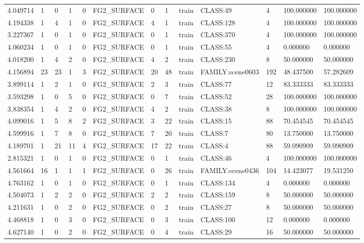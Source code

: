 \begin{tabular}{lllllllllllll}
4.049714 & 1 & 0 & 1 & 0 & FG2\_SURFACE & 0 & 1 & train & CLASS:49 & 4 & 100.000000 & 100.000000 \\
4.194338 & 1 & 4 & 1 & 0 & FG2\_SURFACE & 4 & 1 & train & CLASS:128 & 4 & 100.000000 & 100.000000 \\
3.227367 & 1 & 0 & 1 & 0 & FG2\_SURFACE & 0 & 1 & train & CLASS:370 & 4 & 100.000000 & 100.000000 \\
4.060234 & 1 & 0 & 1 & 0 & FG2\_SURFACE & 0 & 1 & train & CLASS:55 & 4 & 0.000000 & 0.000000 \\
4.018200 & 1 & 4 & 2 & 0 & FG2\_SURFACE & 4 & 2 & train & CLASS:230 & 8 & 50.000000 & 50.000000 \\
4.156894 & 23 & 23 & 1 & 3 & FG2\_SURFACE & 20 & 48 & train & FAMILY:scene0603 & 192 & 48.437500 & 57.282609 \\
3.899114 & 1 & 2 & 1 & 0 & FG2\_SURFACE & 2 & 3 & train & CLASS:77 & 12 & 83.333333 & 83.333333 \\
3.593298 & 1 & 0 & 5 & 0 & FG2\_SURFACE & 0 & 7 & train & CLASS:52 & 28 & 100.000000 & 100.000000 \\
3.838354 & 1 & 4 & 2 & 0 & FG2\_SURFACE & 4 & 2 & train & CLASS:38 & 8 & 100.000000 & 100.000000 \\
4.099016 & 1 & 5 & 8 & 2 & FG2\_SURFACE & 3 & 22 & train & CLASS:15 & 88 & 70.454545 & 70.454545 \\
4.599916 & 1 & 7 & 8 & 0 & FG2\_SURFACE & 7 & 20 & train & CLASS:7 & 80 & 13.750000 & 13.750000 \\
4.189701 & 1 & 21 & 11 & 4 & FG2\_SURFACE & 17 & 22 & train & CLASS:4 & 88 & 59.090909 & 59.090909 \\
2.815321 & 1 & 0 & 1 & 0 & FG2\_SURFACE & 0 & 1 & train & CLASS:46 & 4 & 100.000000 & 100.000000 \\
4.561664 & 16 & 1 & 1 & 1 & FG2\_SURFACE & 0 & 26 & train & FAMILY:scene0436 & 104 & 14.423077 & 19.531250 \\
4.763162 & 1 & 0 & 1 & 0 & FG2\_SURFACE & 0 & 1 & train & CLASS:134 & 4 & 0.000000 & 0.000000 \\
4.504073 & 1 & 2 & 2 & 0 & FG2\_SURFACE & 2 & 2 & train & CLASS:159 & 8 & 50.000000 & 50.000000 \\
4.211631 & 1 & 0 & 2 & 0 & FG2\_SURFACE & 0 & 2 & train & CLASS:27 & 8 & 50.000000 & 50.000000 \\
4.468818 & 1 & 0 & 3 & 0 & FG2\_SURFACE & 0 & 3 & train & CLASS:100 & 12 & 0.000000 & 0.000000 \\
4.627140 & 1 & 0 & 2 & 0 & FG2\_SURFACE & 0 & 4 & train & CLASS:29 & 16 & 50.000000 & 50.000000 \\

\end{tabular}
